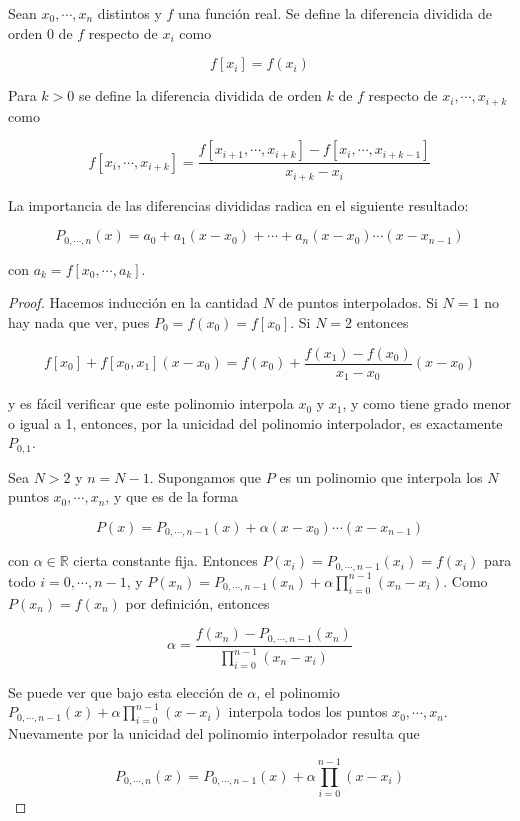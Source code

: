 \begin{defi}
Sean $x_0, \cdots, x_n$ distintos y $f$ una función real. Se define la diferencia dividida de orden 0 de $f$ respecto de $x_i$ como

\[f[x_i] = f(x_i)\]

Para $k > 0$ se define la diferencia dividida de orden $k$ de $f$ respecto de $x_i, \cdots, x_{i + k}$ como

\[f[x_i, \cdots, x_{i + k}] = \frac{f[x_{i + 1}, \cdots, x_{i + k}] - f[x_i, \cdots, x_{i + k - 1}]}{x_{i + k} - x_i}\]
\end{defi}

La importancia de las diferencias divididas radica en el siguiente resultado:

\begin{propo}
\[P_{0, \cdots, n}(x) = a_0 + a_1 (x - x_0) + \cdots + a_n (x - x_0)\cdots (x - x_{n - 1})\]

con $a_k = f[x_0, \cdots, a_k]$.
\begin{proof}
Hacemos inducción en la cantidad $N$ de puntos interpolados. Si $N = 1$ no hay nada que ver, pues $P_0 = f(x_0) = f[x_0]$. Si $N = 2$ entonces

\[f[x_0] + f[x_0, x_1] (x - x_0) = f(x_0) + \frac{f(x_1) - f(x_0)}{x_1 - x_0} (x - x_0)\]

y es fácil verificar que este polinomio interpola $x_0$ y $x_1$, y como tiene grado menor o igual a 1, entonces, por la unicidad del polinomio interpolador, es exactamente $P_{0, 1}$. 

Sea $N > 2$ y $n = N - 1$. Supongamos que $P$ es un polinomio que interpola los $N$ puntos $x_0, \cdots, x_n$, y que es de la forma

\[P(x) = P_{0, \cdots, n - 1}(x) + \alpha (x - x_0) \cdots (x - x_{n - 1})\]

con $\alpha \in \mathbb{R}$ cierta constante fija. Entonces $P(x_i) = P_{0, \cdots, n - 1}(x_i) = f(x_i)$ para todo $i = 0, \cdots, n - 1$, y $P(x_n) = P_{0, \cdots, n - 1}(x_n) + \alpha \prod_{i = 0}^{n - 1}(x_n - x_i)$. Como $P(x_n) = f(x_n)$ por definición, entonces 

\[\alpha = \frac{f(x_n) - P_{0, \cdots, n - 1}(x_n)}{\prod_{i = 0}^{n - 1}(x_n - x_i)}\]

Se puede ver que bajo esta elección de $\alpha$, el polinomio $P_{0, \cdots, n - 1}(x) + \alpha \prod_{i = 0}^{n - 1}(x - x_i)$ interpola todos los puntos $x_0, \cdots, x_n$. Nuevamente por la unicidad del polinomio interpolador resulta que 

\[P_{0, \cdots, n}(x) = P_{0, \cdots, n - 1}(x) + \alpha \prod_{i = 0}^{n - 1}(x - x_i)\]


\end{proof}
\end{propo}
